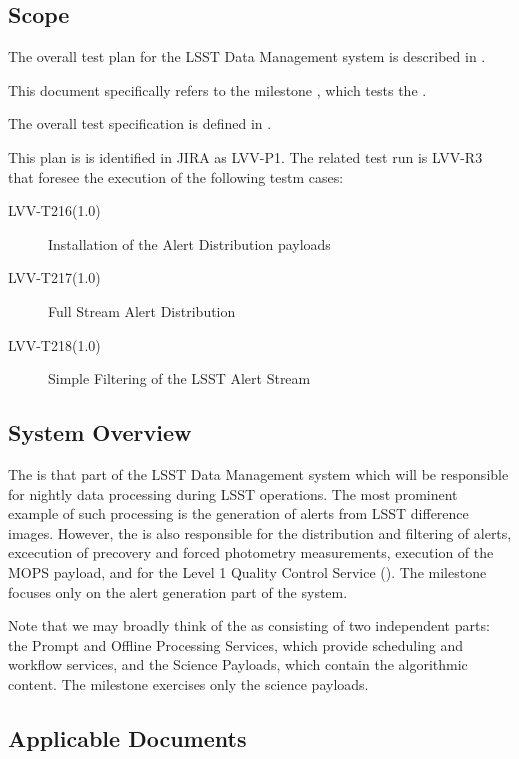 \documentclass[DM,lsstdraft,STR,toc]{lsstdoc}
\begin{document}
\subsection{Scope}
\label{sect:scope}

The overall test plan for the LSST Data Management system is described in .

This document specifically refers to the milestone \milestoneId{}, which tests the \product{}.

The overall \product{} test specification is defined in .

This plan is is identified in JIRA as LVV-P1. The related test run is LVV-R3 that foresee the 
execution of the following testm cases:

\begin{description}

  \item[LVV-T216(1.0)]{Installation of the Alert Distribution payloads}
  \item[LVV-T217(1.0)]{Full Stream Alert Distribution}
  \item[LVV-T218(1.0)]{Simple Filtering of the LSST Alert Stream}

\end{description}

\subsection{System Overview}
\label{sect:systemoverview}

The \product{} is that part of the LSST Data Management system which will be responsible for nightly data processing during LSST operations.
The most prominent example of such processing is the generation of alerts from LSST difference images.
However, the \product{} is also responsible for the distribution and filtering of alerts, excecution of precovery and forced photometry measurements, execution of the MOPS payload, and for the Level 1 Quality Control Service ().
The \milestoneId{} milestone focuses only on the alert generation part of the system.

Note that we may broadly think of the \product{} as consisting of two independent parts: the Prompt and Offline Processing Services, which provide scheduling and workflow services, and the Science Payloads, which contain the algorithmic content.
The \milestoneId{} milestone exercises only the science payloads.


\subsection{Applicable Documents}
\label{sect:appdocs}
\addtocounter{table}{-1}
\end{document}
